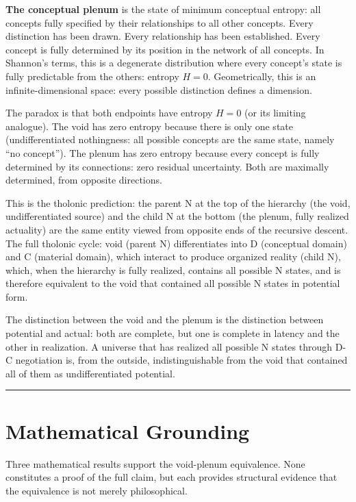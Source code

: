 \documentclass[12pt]{article}
\begin{document}
\textbf{The conceptual plenum} is the state of minimum conceptual
entropy: all concepts fully specified by their relationships to all
other concepts. Every distinction has been drawn. Every relationship has
been established. Every concept is fully determined by its position in
the network of all concepts. In Shannon's terms, this is a degenerate
distribution where every concept's state is fully predictable from the
others: entropy \(H = 0\). Geometrically, this is an
infinite-dimensional space: every possible distinction defines a
dimension.

The paradox is that both endpoints have entropy \(H = 0\) (or its
limiting analogue). The void has zero entropy because there is only one
state (undifferentiated nothingness: all possible concepts are the same
state, namely ``no concept''). The plenum has zero entropy because every
concept is fully determined by its connections: zero residual
uncertainty. Both are maximally determined, from opposite directions.

This is the tholonic prediction: the parent N at the top of the
hierarchy (the void, undifferentiated source) and the child N at the
bottom (the plenum, fully realized actuality) are the same entity viewed
from opposite ends of the recursive descent. The full tholonic cycle:
void (parent N) differentiates into D (conceptual domain) and C
(material domain), which interact to produce organized reality (child
N), which, when the hierarchy is fully realized, contains all possible N
states, and is therefore equivalent to the void that contained all
possible N states in potential form.

The distinction between the void and the plenum is the distinction
between potential and actual: both are complete, but one is complete in
latency and the other in realization. A universe that has realized all
possible N states through D-C negotiation is, from the outside,
indistinguishable from the void that contained all of them as
undifferentiated potential.

\begin{center}\rule{0.5\linewidth}{0.5pt}\end{center}

\section{Mathematical Grounding}\label{mathematical-grounding}

Three mathematical results support the void-plenum equivalence. None
constitutes a proof of the full claim, but each provides structural
evidence that the equivalence is not merely philosophical.
\end{document}
